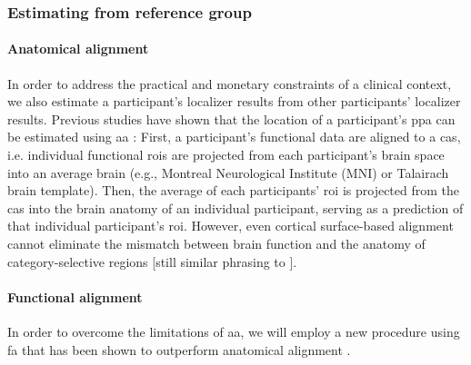 

\subsubsection{Estimating from reference group}



\paragraph{Anatomical alignment}
In order to address the practical and monetary constraints of a clinical context,
we also estimate a participant's localizer results from other participants'
localizer results.
Previous studies have shown that the location of a participant's \ac{ppa} can be
estimated using \ac{aa} \citep{frost2012measuring, rosenke2021probabilistic,
weiner2018defining, zhen2017quantifying}:
%
First, a participant's functional data are aligned to a \ac{cas}, i.e. individual
functional \acp{roi} are projected from each participant's brain space into an
average brain (e.g., Montreal Neurological Institute (MNI) \citep{evans1993mni}
or Talairach brain template).
%
Then, the average of each participants' \ac{roi} is projected from the \ac{cas}
into the brain anatomy of an individual participant, serving as a prediction of
that individual participant's \ac{roi}.
%
However, even cortical surface-based alignment \citep{fischl2012freesurfer}
cannot eliminate the mismatch between brain function and the anatomy of
category-selective regions \citep{duncan2009consistency, frost2012measuring,
weiner2018defining, weiner2014mid} [still similar phrasing to
\citep{feilong2018reliable}].


\paragraph{Functional alignment}


In order to overcome the limitations of \ac{aa}, we will employ a new procedure
using \ac{fa} that has been shown to outperform anatomical alignment
\citep{haxby2020hyperalignment, bazeille2021empirical}.

